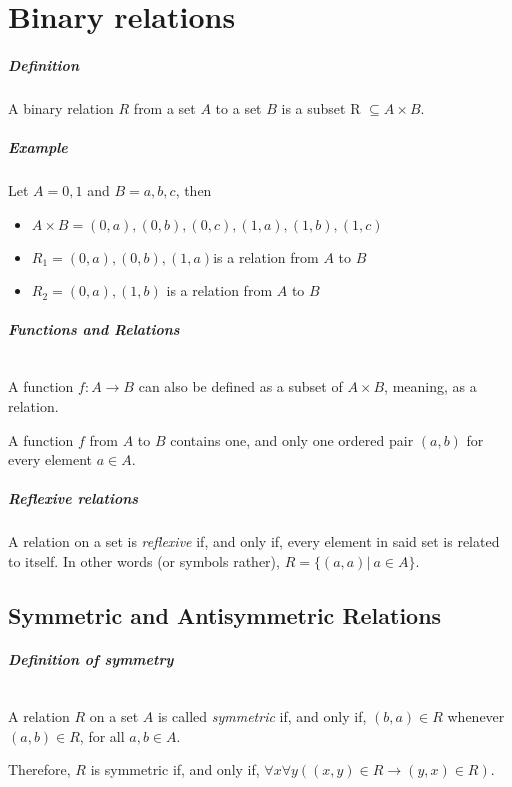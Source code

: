 \documentclass[10pt,a4paper]{book}
\begin{document}
\chapter{Binary relations}

\paragraph*{Definition}
A binary relation $R$ from a set $A$ to a set $B$ is a subset R $\subseteq A \times B$.

\paragraph*{Example}
Let $A = {0,1}$ and $B = {a,b,c}$, then
\begin{itemize}
\item $A \times B ={(0, a),(0, b),(0, c),(1, a), (1, b), (1, c)}$
\item $R_1 ={(0, a), (0, b), (1, a)}$is a relation from $A$ to $B$
\item $R_2 ={(0, a), (1,b)}$ is a relation from $A$ to $B$
\end{itemize}

\paragraph*{Functions and Relations}
$\ $\par 
A function $f:A \to B$ can also be defined as a subset of $A \times B$, meaning, as a relation.\par
A function $f$ from $A$ to $B$ contains one, and only one ordered pair $(a,b)$ for every element $a \in A$.

\paragraph*{Reflexive relations}
A relation on a set is \textit{reflexive} if, and only if, every element in said set is related to itself. In other words (or symbols rather), $R = \{(a,a)|\ a\in A\}$.

\section{Symmetric and Antisymmetric Relations}

\paragraph*{Definition of symmetry}
$\ $\par 
A relation $R$ on a set $A$ is called \textit{symmetric} if, and only if, $(b,a) \in R$ whenever $(a,b) \in R$, for all $a,b \in A$.\par
Therefore, $R$ is symmetric if, and only if, $\forall x \forall y ((x,y) \in R \to (y,x) \in R)$.
\end{document}

